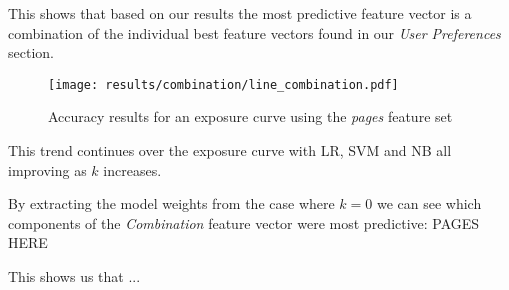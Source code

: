 This shows that based on our results the most predictive feature vector is a combination of the individual best feature vectors found 
in our \emph{User Preferences} section.

\clearpage

\begin{figure}[h]
	\begin{center}
		\texttt{[image: results/combination/line\_combination.pdf]}
		\caption{Accuracy results for an exposure curve using the \emph{pages} feature set}
	\end{center}
\end{figure}

This trend continues over the exposure curve with LR, SVM and NB all improving as $k$ increases.

By extracting the model weights from the case where $k=0$ we can see which components of the \emph{Combination} feature vector were most
predictive:
PAGES HERE

This shows us that ...

